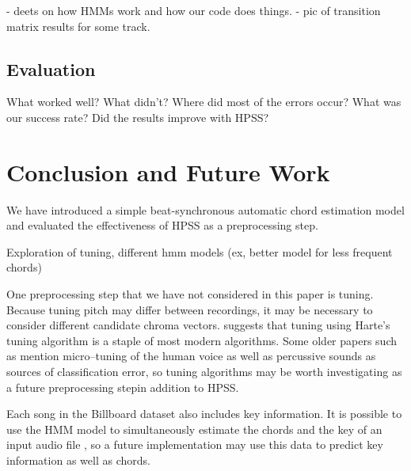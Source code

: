 \documentclass{article}
\begin{document}
- deets on how HMMs work and how our code does things.
- pic of transition matrix results for some track.

\subsection{Evaluation}

What worked well? What didn't? Where did most of the errors occur?
What was our success rate? Did the results improve with HPSS?

\section{Conclusion and Future Work}

We have introduced a simple beat-synchronous automatic chord estimation model
and evaluated the effectiveness of HPSS as a preprocessing step.

Exploration of tuning, different hmm models (ex, better model for less frequent chords)

One preprocessing step that we have not considered in this paper is tuning. Because tuning pitch
may differ between recordings, it may be necessary to consider different candidate chroma vectors.
\cite{McVicar:00} suggests that tuning using Harte's tuning algorithm is a staple of most modern
algorithms. Some older papers such as \cite{Zenz:20} mention micro--tuning of the human voice as well
as percussive sounds as sources of classification error, so tuning algorithms may be worth investigating
as a future preprocessing stepin addition to HPSS.

Each song in the Billboard dataset also includes key information. It is possible to use the HMM model to
simultaneously estimate the chords and the key of an input audio file \cite{McVicar:00}, so a future
implementation may use this data to predict key information as well as chords.
\end{document}
